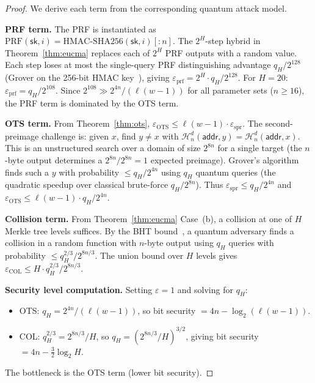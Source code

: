 \documentclass[11pt]{article}
\newcommand{\hash}{\mathcal{H}}
\newcommand{\prf}{\mathrm{PRF}}
\begin{document}
\begin{proof}
We derive each term from the corresponding quantum attack model.

\textbf{PRF term.} The PRF is instantiated as
$\prf(\mathsf{sk}, i) = \mathrm{HMAC}\text{-}\mathrm{SHA256}(\mathsf{sk}, i)[{:}n]$.
The $2^H$-step hybrid in Theorem~\ref{thm:eucma} replaces each of
$2^H$ PRF outputs with a random value. Each step loses at most the
single-query PRF distinguishing advantage $q_H / 2^{128}$ (Grover on
the 256-bit HMAC key~\cite{grover}), giving
$\varepsilon_{\mathrm{prf}} = 2^H \cdot q_H / 2^{128}$. For $H = 20$:
$\varepsilon_{\mathrm{prf}} = q_H / 2^{108}$. Since $2^{108} \gg
2^{4n} / (\ell(w-1))$ for all parameter sets ($n \geq 16$), the PRF
term is dominated by the OTS term.

\textbf{OTS term.} From Theorem~\ref{thm:ots},
$\varepsilon_{\mathrm{OTS}} \leq \ell(w-1) \cdot
\varepsilon_{\mathrm{spr}}$. The second-preimage challenge is:
given $x$, find $y \neq x$ with $\hash_n^d(\mathsf{addr}, y) =
\hash_n^d(\mathsf{addr}, x)$. This is an unstructured search over a
domain of size $2^{8n}$ for a single target (the $n$-byte output
determines a $2^{8n}/2^{8n} = 1$ expected preimage). Grover's algorithm
finds such a $y$ with probability $\leq q_H / 2^{4n}$ using $q_H$
quantum queries (the quadratic speedup over classical brute-force
$q_H / 2^{8n}$). Thus $\varepsilon_{\mathrm{spr}} \leq q_H / 2^{4n}$
and $\varepsilon_{\mathrm{OTS}} \leq \ell(w-1) \cdot q_H / 2^{4n}$.

\textbf{Collision term.} From Theorem~\ref{thm:eucma} Case~(b), a
collision at one of $H$ Merkle tree levels suffices. By the BHT
bound~\cite{bht}, a quantum adversary finds a collision in a random
function with $n$-byte output using $q_H$ queries with probability
$\leq q_H^{2/3} / 2^{8n/3}$. The union bound over $H$ levels gives
$\varepsilon_{\mathrm{COL}} \leq H \cdot q_H^{2/3} / 2^{8n/3}$.

\textbf{Security level computation.} Setting $\varepsilon = 1$ and
solving for $q_H$:
\begin{itemize}
\item OTS: $q_H = 2^{4n} / (\ell(w-1))$, so bit security
$= 4n - \log_2(\ell(w-1))$.
\item COL: $q_H^{2/3} = 2^{8n/3} / H$, so
$q_H = (2^{8n/3}/H)^{3/2}$, giving bit security
$= 4n - \frac{3}{2}\log_2 H$.
\end{itemize}
The bottleneck is the OTS term (lower bit security).
\end{proof}
\end{document}
